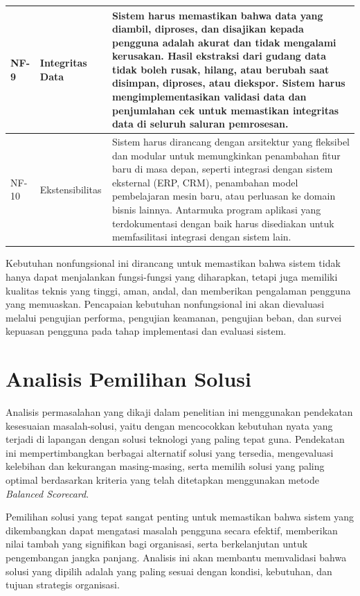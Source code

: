\begin{longtable}{|p{1.3cm}|p{4.5cm}|p{7cm}|}
NF-9 & Integritas Data & Sistem harus memastikan bahwa data yang diambil, diproses, dan disajikan kepada pengguna adalah akurat dan tidak mengalami kerusakan. Hasil ekstraksi dari gudang data tidak boleh rusak, hilang, atau berubah saat disimpan, diproses, atau diekspor. Sistem harus mengimplementasikan validasi data dan penjumlahan cek untuk memastikan integritas data di seluruh saluran pemrosesan. \\
\hline

NF-10 & Ekstensibilitas & Sistem harus dirancang dengan arsitektur yang fleksibel dan modular untuk memungkinkan penambahan fitur baru di masa depan, seperti integrasi dengan sistem eksternal (ERP, CRM), penambahan model pembelajaran mesin baru, atau perluasan ke domain bisnis lainnya. Antarmuka program aplikasi yang terdokumentasi dengan baik harus disediakan untuk memfasilitasi integrasi dengan sistem lain. \\
\hline

\end{longtable}

Kebutuhan nonfungsional ini dirancang untuk memastikan bahwa sistem tidak hanya dapat menjalankan fungsi-fungsi yang diharapkan, tetapi juga memiliki kualitas teknis yang tinggi, aman, andal, dan memberikan pengalaman pengguna yang memuaskan. Pencapaian kebutuhan nonfungsional ini akan dievaluasi melalui pengujian performa, pengujian keamanan, pengujian beban, dan survei kepuasan pengguna pada tahap implementasi dan evaluasi sistem.

\section{Analisis Pemilihan Solusi}

Analisis permasalahan yang dikaji dalam penelitian ini menggunakan pendekatan kesesuaian masalah-solusi, yaitu dengan mencocokkan kebutuhan nyata yang terjadi di lapangan dengan solusi teknologi yang paling tepat guna. Pendekatan ini mempertimbangkan berbagai alternatif solusi yang tersedia, mengevaluasi kelebihan dan kekurangan masing-masing, serta memilih solusi yang paling optimal berdasarkan kriteria yang telah ditetapkan menggunakan metode \textit{Balanced Scorecard}.

Pemilihan solusi yang tepat sangat penting untuk memastikan bahwa sistem yang dikembangkan dapat mengatasi masalah pengguna secara efektif, memberikan nilai tambah yang signifikan bagi organisasi, serta berkelanjutan untuk pengembangan jangka panjang. Analisis ini akan membantu memvalidasi bahwa solusi yang dipilih adalah yang paling sesuai dengan kondisi, kebutuhan, dan tujuan strategis organisasi.

